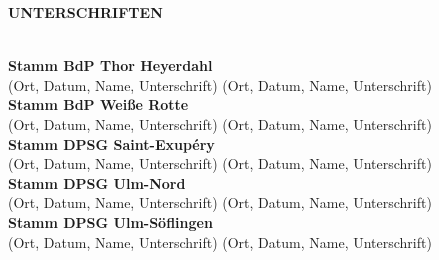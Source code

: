 \begin{Large}
    \textbf{UNTERSCHRIFTEN}
\end{Large}
\\

\textbf{Stamm BdP Thor Heyerdahl}
\\
(Ort, Datum, Name, Unterschrift) (Ort, Datum, Name, Unterschrift)
\\

\textbf{Stamm BdP Weiße Rotte}
\\
(Ort, Datum, Name, Unterschrift) (Ort, Datum, Name, Unterschrift)
\\

\textbf{Stamm DPSG Saint-Exupéry}
\\
(Ort, Datum, Name, Unterschrift) (Ort, Datum, Name, Unterschrift)
\\

\textbf{Stamm DPSG Ulm-Nord}
\\
(Ort, Datum, Name, Unterschrift) (Ort, Datum, Name, Unterschrift)
\\

\textbf{Stamm DPSG Ulm-Söflingen}
\\
(Ort, Datum, Name, Unterschrift) (Ort, Datum, Name, Unterschrift)
